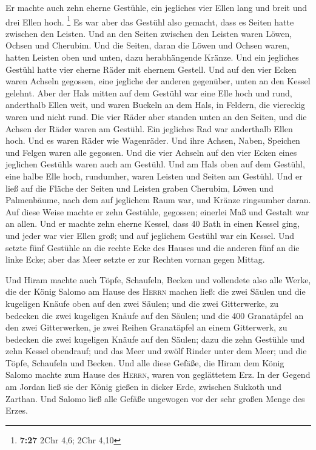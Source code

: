  Er machte auch zehn eherne Gestühle, ein jegliches vier
Ellen lang und breit und drei Ellen hoch. \footnote{\textbf{7:27} 2Chr
  4,6; 2Chr 4,10}  Es war aber das Gestühl also gemacht,
dass es Seiten hatte zwischen den Leisten.  Und an den
Seiten zwischen den Leisten waren Löwen, Ochsen und Cherubim. Und die
Seiten, daran die Löwen und Ochsen waren, hatten Leisten oben und unten,
dazu herabhängende Kränze.  Und ein jegliches Gestühl
hatte vier eherne Räder mit ehernem Gestell. Und auf den vier Ecken
waren Achseln gegossen, eine jegliche der anderen gegenüber, unten an
den Kessel gelehnt.  Aber der Hals mitten auf dem Gestühl
war eine Elle hoch und rund, anderthalb Ellen weit, und waren Buckeln an
dem Hals, in Feldern, die viereckig waren und nicht rund.
 Die vier Räder aber standen unten an den Seiten, und die
Achsen der Räder waren am Gestühl. Ein jegliches Rad war anderthalb
Ellen hoch.  Und es waren Räder wie Wagenräder. Und ihre
Achsen, Naben, Speichen und Felgen waren alle gegossen. 
Und die vier Achseln auf den vier Ecken eines jeglichen Gestühls waren
auch am Gestühl.  Und am Hals oben auf dem Gestühl, eine
halbe Elle hoch, rundumher, waren Leisten und Seiten am Gestühl.
 Und er ließ auf die Fläche der Seiten und Leisten graben
Cherubim, Löwen und Palmenbäume, nach dem auf jeglichem Raum war, und
Kränze ringsumher daran.  Auf diese Weise machte er zehn
Gestühle, gegossen; einerlei Maß und Gestalt war an allen.
 Und er machte zehn eherne Kessel, dass 40 Bath in einen
Kessel ging, und jeder war vier Ellen groß; und auf jeglichem Gestühl
war ein Kessel.  Und setzte fünf Gestühle an die rechte
Ecke des Hauses und die anderen fünf an die linke Ecke; aber das Meer
setzte er zur Rechten vornan gegen Mittag.

 Und Hiram machte auch Töpfe, Schaufeln, Becken und
vollendete also alle Werke, die der König Salomo am Hause des
\textsc{Herrn} machen ließ:  die zwei Säulen und die
kugeligen Knäufe oben auf den zwei Säulen; und die zwei Gitterwerke, zu
bedecken die zwei kugeligen Knäufe auf den Säulen;  und
die 400 Granatäpfel an den zwei Gitterwerken, je zwei Reihen Granatäpfel
an einem Gitterwerk, zu bedecken die zwei kugeligen Knäufe auf den
Säulen;  dazu die zehn Gestühle und zehn Kessel
obendrauf;  und das Meer und zwölf Rinder unter dem Meer;
 und die Töpfe, Schaufeln und Becken. Und alle diese
Gefäße, die Hiram dem König Salomo machte zum Hause des \textsc{Herrn},
waren von geglättetem Erz.  In der Gegend am Jordan ließ
sie der König gießen in dicker Erde, zwischen Sukkoth und Zarthan.
 Und Salomo ließ alle Gefäße ungewogen vor der sehr
großen Menge des Erzes.

